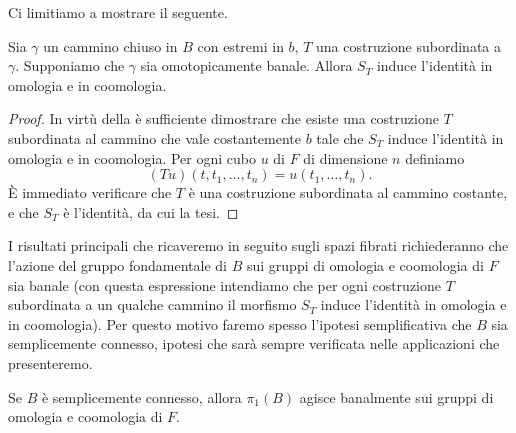 Ci limitiamo a mostrare il seguente.
\begin{corollary}
Sia $\gamma$ un cammino chiuso in $B$ con estremi in $b$, $T$ una costruzione subordinata a $\gamma$. Supponiamo che $\gamma$ sia omotopicamente banale. Allora $S_T$ induce l'identità in omologia e in coomologia.
\end{corollary}
\begin{proof}
In virtù della  è sufficiente dimostrare che esiste una costruzione $T$ subordinata al cammino che vale costantemente $b$ tale che $S_T$ induce l'identità in omologia e in coomologia. Per ogni cubo $u$ di $F$ di dimensione $n$ definiamo
$$
(Tu)(t,t_1,\ldots,t_n)=u(t_1,\ldots,t_n).
$$
È immediato verificare che $T$ è una costruzione subordinata al cammino costante, e che $S_T$ è l'identità, da cui la tesi.
\end{proof}

I risultati principali che ricaveremo in seguito sugli spazi fibrati richiederanno che l'azione del gruppo fondamentale di $B$ sui gruppi di omologia e coomologia di $F$ sia banale (con questa espressione intendiamo che per ogni costruzione $T$ subordinata a un qualche cammino il morfismo $S_T$ induce l'identità in omologia e in coomologia). Per questo motivo faremo spesso l'ipotesi semplificativa che $B$ sia semplicemente connesso, ipotesi che sarà sempre verificata nelle applicazioni che presenteremo.

\begin{corollary}
Se $B$ è semplicemente connesso, allora $\pi_1(B)$ agisce banalmente sui gruppi di omologia e coomologia di $F$.
\end{corollary}